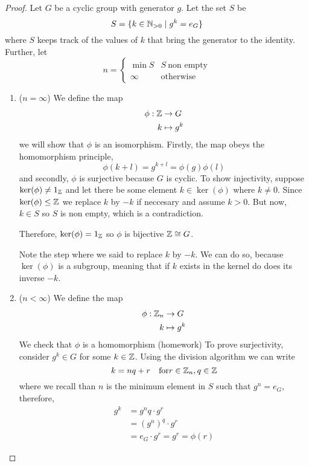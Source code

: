 \documentclass{article}
\begin{document}
\begin{proof}
    Let $G$ be a cyclic group with generator $g$. Let the set $S$ be
    \[
        S = \{k \in \mathbb{N}_{>0} \mid g^k = e_G\}  
    \]
    where $S$ keeps track of the values of $k$ that bring the generator to the identity. Further, let
    \[
        n = \begin{cases}
            \min S & S \ \text{non empty} \\
            \infty & \text{otherwise}
        \end{cases}  
    \]

    \begin{enumerate}[cases]
        \item ($n = \infty$) We define the map
        \begin{align*}
            \phi : \mathbb{Z} &\rightarrow G \\
            k &\mapsto g^k
        \end{align*}
        we will show that $\phi$ is an isomorphism. Firstly, the map obeys the homomorphism principle,
        \[
            \phi(k + l) = g^{k + l} = \phi(g)\phi(l)   
        \]
        and secondly, $\phi$ is surjective because $G$ is cyclic. To show injectivity, suppose $\ker(\phi) \neq 1_{\mathbb{Z}}$ and let there be some element $k \in \ker(\phi)$ where $k \neq 0$.
        Since $\ker(\phi) \leq \mathbb{Z}$ we replace $k$ by $-k$ if neccesary and assume $k > 0$. But now, $k \in S$ so $S$ is non empty, which is a contradiction. \contradiction
        
        Therefore, $\ker(\phi) = 1_{\mathbb{Z}}$ so $\phi$ is bijective $\mathbb{Z} \cong G$.

        Note the step where we said to replace $k$ by $-k$. We can do so, because $\ker(\phi)$ is a subgroup, meaning that if $k$ exists in the kernel do does its inverse $-k$.

        \item ($n < \infty$) We define the map
        \begin{align*}
            \phi : \mathbb{Z}_n &\rightarrow G \\
            k &\mapsto g^k
        \end{align*}
        We check that $\phi$ is a homomorphism (homework)
        To prove surjectivity, consider $g^k \in G$ for some $k \in \mathbb{Z}$. Using the division algorithm we can write
        \[
            k = nq + r \quad \text{for} r \in \mathbb{Z}_n, q \in \mathbb{Z}
        \]
        where we recall than $n$ is the minimum element in $S$ such that $g^n = e_G$, therefore,
        \begin{align*}
            g^k &= g^nq \cdot g^r \\
            &= (g^n)^q \cdot g^r \\
            &= e_G \cdot g^r = g^r = \phi(r)
        \end{align*}
        

\end{enumerate}
\end{proof}
\end{document}
